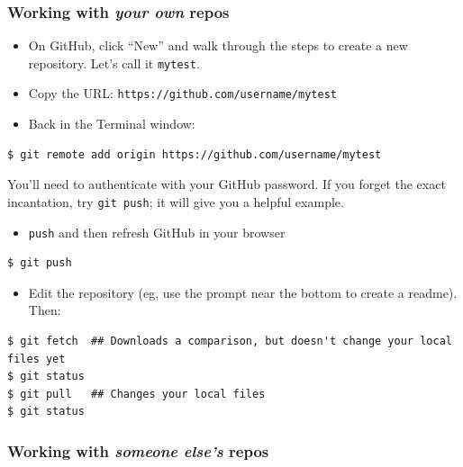 \documentclass[
]{article}
\providecommand{\tightlist}{%
  \setlength{\itemsep}{0pt}\setlength{\parskip}{0pt}}
\begin{document}
\hypertarget{working-with-your-own-repos}{%
\subsubsection{\texorpdfstring{Working with \emph{your own} repos}{Working with your own repos}}\label{working-with-your-own-repos}}

\begin{itemize}
\tightlist
\item
  On GitHub, click ``New'' and walk through the steps to create a new repository. Let's call it \texttt{mytest}.
\item
  Copy the URL: \texttt{https://github.com/username/mytest}
\item
  Back in the Terminal window:
\end{itemize}

\begin{verbatim}
$ git remote add origin https://github.com/username/mytest
\end{verbatim}

You'll need to authenticate with your GitHub password. If you forget the exact incantation, try \texttt{git\ push}; it will give you a helpful example.

\begin{itemize}
\tightlist
\item
  \texttt{push} and then refresh GitHub in your browser
\end{itemize}

\begin{verbatim}
$ git push
\end{verbatim}

\begin{itemize}
\tightlist
\item
  Edit the repository (eg, use the prompt near the bottom to create a readme). Then:
\end{itemize}

\begin{verbatim}
$ git fetch  ## Downloads a comparison, but doesn't change your local files yet
$ git status
$ git pull   ## Changes your local files
$ git status
\end{verbatim}

\hypertarget{working-with-someone-elses-repos}{%
\subsubsection{\texorpdfstring{Working with \emph{someone else's} repos}{Working with someone else's repos}}\label{working-with-someone-elses-repos}}
\end{document}
